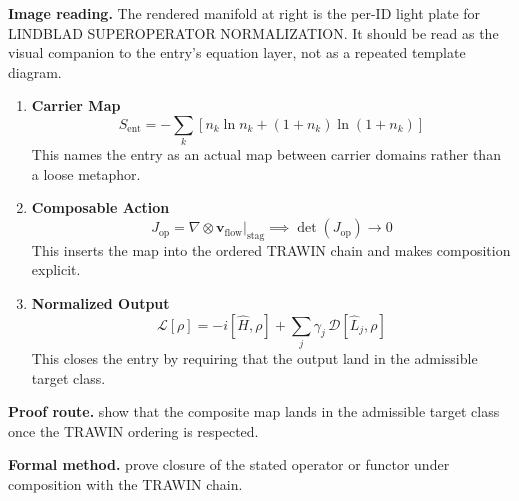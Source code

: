 \begin{samepage}
\noindent\begin{minipage}[t]{0.45\linewidth}
\vspace{0pt}
\raggedright
\scriptsize\textbf{Image reading.} The rendered manifold at right is the per-ID light plate for LINDBLAD SUPEROPERATOR NORMALIZATION. It should be read as the visual companion to the entry's equation layer, not as a repeated template diagram.\par
\end{minipage}\hfill
\begin{minipage}[t]{0.53\linewidth}
\vspace*{-0.10in}
\raggedright
{}
\end{minipage}
\end{samepage}

\clearpage


\begin{enumerate}[leftmargin=1.6em,itemsep=9pt,topsep=6pt]
\item \textbf{Carrier Map}
\[
S_{\mathrm{ent}}
=
-\sum_k\left[n_k\ln n_k+(1+n_k)\ln(1+n_k)\right]
\]
This names the entry as an actual map between carrier domains rather than a loose metaphor.

\item \textbf{Composable Action}
\[
J_{\mathrm{op}}
=
\nabla\otimes\mathbf{v}_{\mathrm{flow}}\big|_{\mathrm{stag}}
\implies
\det(J_{\mathrm{op}})\to0
\]
This inserts the map into the ordered TRAWIN chain and makes composition explicit.

\item \textbf{Normalized Output}
\[
\mathcal{L}[\rho]
=
-i[\widehat{H},\rho]
+\sum_j\gamma_j\,\mathcal{D}[\widehat{L}_j,\rho]
\]
This closes the entry by requiring that the output land in the admissible target class.
\end{enumerate}

\textbf{Proof route.} show that the composite map lands in the admissible target class once the TRAWIN ordering is respected.

\textbf{Formal method.} prove closure of the stated operator or functor under composition with the TRAWIN chain.

\medskip
{}


